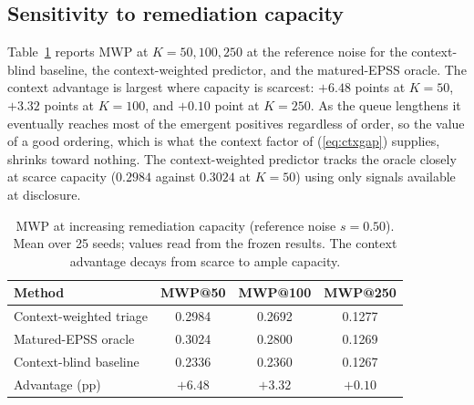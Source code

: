 \documentclass[journal]{IEEEtran}
\begin{document}
\subsection{Sensitivity to remediation capacity}
Table~\ref{tab:capacity} reports MWP at $K = 50, 100, 250$ at the reference noise for the
context-blind baseline, the context-weighted predictor, and the matured-EPSS oracle. The context
advantage is largest where capacity is scarcest: $+6.48$ points at $K = 50$, $+3.32$ points at
$K = 100$, and $+0.10$ point at $K = 250$. As the queue lengthens it eventually reaches most of the
emergent positives regardless of order, so the value of a good ordering, which is what the context
factor of (\ref{eq:ctxgap}) supplies, shrinks toward nothing. The context-weighted predictor tracks
the oracle closely at scarce capacity ($0.2984$ against $0.3024$ at $K = 50$) using only signals
available at disclosure.

\begin{table}[t]
\centering
\caption{MWP at increasing remediation capacity (reference noise $s = 0.50$). Mean over 25 seeds;
values read from the frozen results. The context advantage decays from scarce to ample capacity.}
\label{tab:capacity}
\footnotesize
\begin{tabular}{@{}lccc@{}}
\toprule
Method & MWP@50 & MWP@100 & MWP@250 \\
\midrule
Context-weighted triage & 0.2984 & 0.2692 & 0.1277 \\
Matured-EPSS oracle & 0.3024 & 0.2800 & 0.1269 \\
Context-blind baseline & 0.2336 & 0.2360 & 0.1267 \\
\midrule
Advantage (pp) & $+6.48$ & $+3.32$ & $+0.10$ \\
\bottomrule
\end{tabular}
\end{table}
\end{document}
